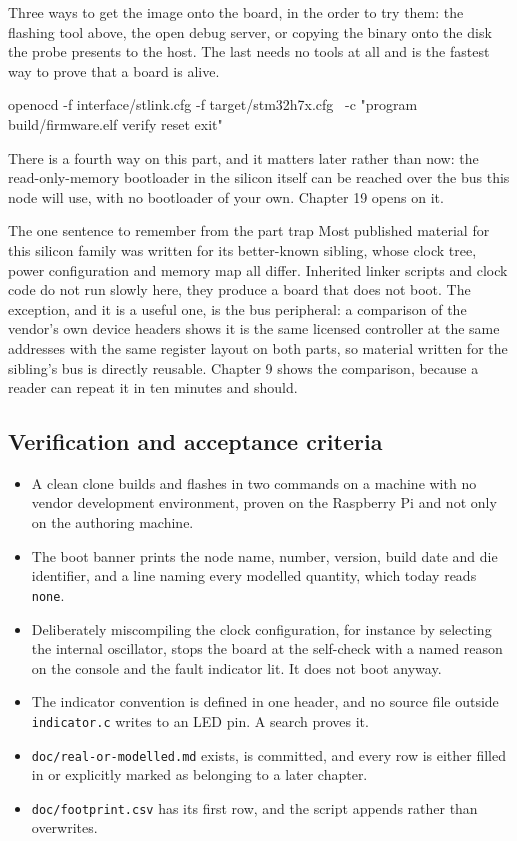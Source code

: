 Three ways to get the image onto the board, in the order to try them: the
flashing tool above, the open debug server, or copying the binary onto the disk
the probe presents to the host. The last needs no tools at all and is the
fastest way to prove that a board is alive.

\begin{shellcode}
openocd -f interface/stlink.cfg -f target/stm32h7x.cfg \
  -c "program build/firmware.elf verify reset exit"
\end{shellcode}

There is a fourth way on this part, and it matters later rather than now: the
read-only-memory bootloader in the silicon itself can be reached over the bus
this node will use, with no bootloader of your own. Chapter 19 opens on it.

\begin{note}{The one sentence to remember from the part trap}
Most published material for this silicon family was written for its better-known
sibling, whose clock tree, power configuration and memory map all differ.
Inherited linker scripts and clock code do not run slowly here, they produce a
board that does not boot. The exception, and it is a useful one, is the bus
peripheral: a comparison of the vendor's own device headers shows it is the same
licensed controller at the same addresses with the same register layout on both
parts, so material written for the sibling's bus is directly reusable. Chapter 9
shows the comparison, because a reader can repeat it in ten minutes and should.
\end{note}

\subsection*{Verification and acceptance criteria}

\begin{itemize}
\item A clean clone builds and flashes in two commands on a machine with no
vendor development environment, proven on the Raspberry Pi and not only on the
authoring machine.
\item The boot banner prints the node name, number, version, build date and die
identifier, and a line naming every modelled quantity, which today reads
\texttt{none}.
\item Deliberately miscompiling the clock configuration, for instance by
selecting the internal oscillator, stops the board at the self-check with a
named reason on the console and the fault indicator lit. It does not boot
anyway.
\item The indicator convention is defined in one header, and no source file
outside \texttt{indicator.c} writes to an LED pin. A search proves it.
\item \texttt{doc/real-or-modelled.md} exists, is committed, and every row is
either filled in or explicitly marked as belonging to a later chapter.
\item \texttt{doc/footprint.csv} has its first row, and the script appends
rather than overwrites.
\end{itemize}

